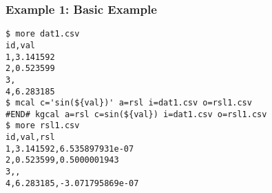 \subsubsection*{Example 1: Basic Example}



\begin{Verbatim}[baselinestretch=0.7,frame=single]
$ more dat1.csv
id,val
1,3.141592
2,0.523599
3,
4,6.283185
$ mcal c='sin(${val})' a=rsl i=dat1.csv o=rsl1.csv
#END# kgcal a=rsl c=sin(${val}) i=dat1.csv o=rsl1.csv
$ more rsl1.csv
id,val,rsl
1,3.141592,6.535897931e-07
2,0.523599,0.5000001943
3,,
4,6.283185,-3.071795869e-07
\end{Verbatim}
